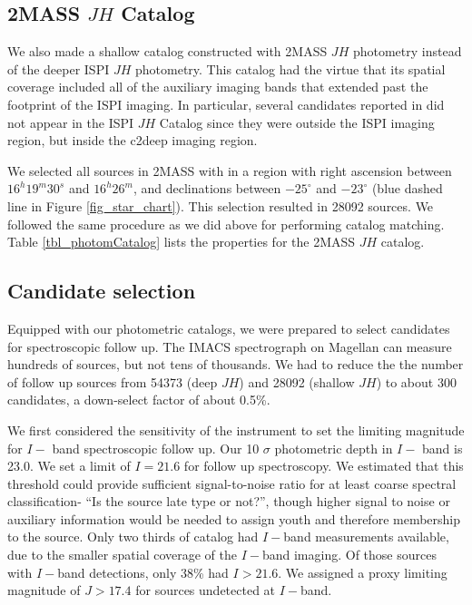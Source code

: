 \subsection{2MASS $JH$ Catalog}
We also made a shallow catalog constructed with 2MASS $JH$ photometry instead of the deeper ISPI $JH$ photometry.  This catalog had the virtue that its spatial coverage included all of the auxiliary imaging bands that extended past the footprint of the ISPI imaging.  In particular, several candidates reported in \citet{2010ApJ...720.1374H} did not appear in the ISPI $JH$ Catalog since they were outside the ISPI imaging region, but inside the c2deep imaging region.

We selected all sources in 2MASS with in a region with right ascension between $16^h19^m30^s$ and $16^h26^m$, and declinations between $-25^{\circ}$ and $-23^{\circ}$ (blue dashed line in Figure \ref{fig_star_chart}).  This selection resulted in 28092 sources.  We followed the same procedure as we did above for performing catalog matching.  Table \ref{tbl_photomCatalog} lists the properties for the 2MASS $JH$ catalog.


\subsection{Candidate selection}


Equipped with our photometric catalogs, we were prepared to select candidates for spectroscopic follow up.  The IMACS spectrograph on Magellan can measure hundreds of sources, but not tens of thousands.  We had to reduce the the number of follow up sources from 54373 (deep $JH$) and 28092 (shallow $JH$) to about 300 candidates, a down-select factor of about 0.5\%.  

We first considered the sensitivity of the instrument to set the limiting magnitude for $I-$ band spectroscopic follow up.  Our 10 $\sigma$ photometric depth in $I-$ band is 23.0.  We set a limit of $I=21.6$ for follow up spectroscopy.  We estimated that this threshold could provide sufficient signal-to-noise ratio for at least coarse spectral classification- ``Is the source late type or not?'', though higher signal to noise or auxiliary information would be needed to assign youth and therefore membership to the source.  Only two thirds of catalog had $I-$band measurements available, due to the smaller spatial coverage of the $I-$band imaging.  Of those sources with $I-$band detections, only 38\% had $I>21.6$.  We assigned a proxy limiting magnitude of $J>17.4$ for sources undetected at $I-$band.


